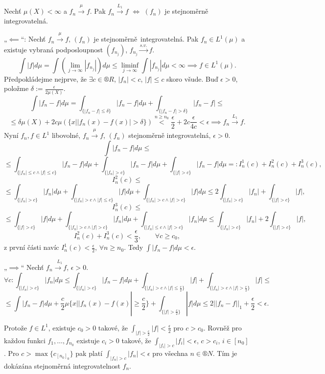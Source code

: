 \documentclass[12pt]{article}					%
\begin{document}
\begin{veta}
	Nechť $\mu(X) < ∞$ a $f_n \overset{\mu}{\rightarrow} f$. Pak $f_n \overset{L_1}{\rightarrow} f$ $\Leftrightarrow$ $(f_n)$ je stejnoměrně integrovatelná.

	\begin{dukazin}
		„$\impliedby$“: Nechť $f_n \overset{\mu}{\rightarrow} f$, $(f_n)$ je stejnoměrně integrovatelná. Pak $f_n \in L^1(\mu)$ a existuje vybraná podposloupnost $(f_{n_j})$, $f_{n_j} \overset{s. v.}{\rightarrow} f$.
		$$ \int |f| d\mu = \int(\lim_{j \rightarrow ∞} |f_{n_j}|)d \mu ≤ \liminf_{j \rightarrow ∞} \int |f_{n_j}| d\mu < ∞ \implies f \in L^1(\mu). $$
		Předpokládejme nejprve, že $\exists c \in ®R$, $|f_n| < c$, $|f| ≤ c$ skoro všude. Buď $\epsilon > 0$, položme $\delta := \frac{\epsilon}{2 \mu(X)}$.
		$$ \int |f_n - f| d\mu = \int_{\{|f_n - f| ≤ \delta\}} |f_n - f| d\mu + \int_{\{|f_n - f| > \delta\}} |f_n - f| ≤ $$
		$$ ≤ \delta \mu(X) + 2c \mu(\{x | |f_n(x) - f(x)| > \delta\}) \overset{n ≥ n_0}{<} \frac{\epsilon}{2} + 2c\frac{\epsilon}{4c} < \epsilon \implies f_n \overset{L_1}{\rightarrow} f. $$
		Nyní $f_n, f \in L^1$ libovolné, $f_n \overset{\mu}{\rightarrow} f$, $(f_n)$ stejnoměrně integrovatelná, $\epsilon > 0$.
		$$ \int |f_n - f| d\mu ≤ $$
		$$ ≤ \int_{\{|f_n| ≤ c \land |f| ≤ c\}} |f_n - f| d\mu + \int_{\{|f_n| > c\}} |f_n - f| d\mu + \int_{\{|f| > c\}} |f_n - f| d\mu=: I_n^1(c) + I_n^2(c) + I_n^3(c), $$
		$$ I_n^2(c) ≤ $$
		$$ ≤ \int_{\{|f_n| > c\}} |f_n| d\mu + \int_{\{|f_n| > c \land |f| ≤ c\}} |f| d\mu + \int_{\{|f_n| > c \land |f| > c\}} |f| d\mu ≤ 2 \int_{\{|f_n| > c\}} |f_n| + \int_{\{|f| > c\}} |f|, $$
		$$ I_n^3(c) ≤ $$
		$$ ≤ \int_{\{|f| > c\}} |f| d\mu + \int_{\{|f_n| > c \land |f| > c\}} |f_n| d\mu + \int_{\{|f_n| ≤ c \land |f| > c\}} |f_n| d\mu ≤ \int_{\{|f_n| > c\}} |f_n| + 2\int_{\{|f| > c\}} |f|, $$
		$$ I_n^2(c) + I_n^3(c) < \frac{\epsilon}{3}, \qquad \forall c ≥ c_0, $$
		z první části navíc $I_n^1(c) < \frac{\epsilon}{2}$, $\forall n ≥ n_0$. Tedy $\int |f_n - f| d\mu < \epsilon$.

		„$\implies$“ Nechť $f_n \overset{L_1}{\rightarrow f}$, $\epsilon >0$.
		$$ \forall c: \int_{\{|f_n| > c\}} |f_n| d\mu ≤ \int_{\{|f_n| > c\}} |f_n - f|d\mu + \int_{\{|f_n| > c \land |f| ≤ \frac{c}{2}\}} |f| + \int_{\{|f_n| > c \land |f| > \frac{c}{2}\}} |f| ≤ $$
		$$ ≤ \int |f_n - f|d\mu + \frac{c}{2} \mu \{x | |f_n(x) - f(x)| ≥ \frac{c}{2}\} + \int_{\{|f| > \frac{c}{2}\}} |f| d\mu ≤ 2||f_n - f||_1 + \frac{\epsilon}{2} < \epsilon. $$

		Protože $f \in L^1$, existuje $c_0>0$ takové, že $\int_{|f|>\frac{c}{2}} |f| < \frac{\epsilon}{2}$ pro $c > c_0$. Rovněž pro každou funkci $f_1, …, f_{n_0}$ existuje $c_i > 0$ takové, že $\int_{|f_i| > c} |f_i| < \epsilon$, $c > c_i$, $i \in [n_0]$. Pro $c > \max\{c_{[n_0]_0}\}$ pak platí $\int_{|f_n| > c} |f_n| < \epsilon$ pro všechna $n \in ®N$. Tím je dokázána stejnoměrná integrovatelnost $f_n$.
	\end{dukazin}
\end{veta}
\end{document}
